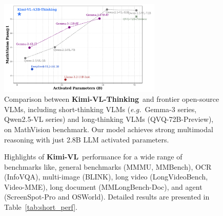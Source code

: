 \documentclass{article}
\newcommand{\ourname}{{Kimi-VL}}
\newcommand{\ourreasoningname}{{\ourname-Thinking}}
\newcommand{\ychen}[2]{\textcolor{#1}{ychen:#2}}
\begin{document}
\begin{figure}[htb!]
    \centering
    \includegraphics[width=0.69\textwidth]{figures/fig1_0409_v1.pdf}
    
    \caption{Comparison between \textbf{\ourreasoningname}~and frontier open-source VLMs, including short-thinking VLMs (\textit{e.g.}~Gemma-3 series, Qwen2.5-VL series) and long-thinking VLMs (QVQ-72B-Preview), on MathVision benchmark. Our model achieves strong multimodal reasoning with just 2.8B LLM activated parameters.} %
    \label{fig:results_via_parameter}
\end{figure}




\begin{figure}[htb]
    \centering
    \caption{Highlights of \textbf{\ourname}~performance for a wide range of benchmarks like, general benchmarks (MMMU, MMBench), OCR (InfoVQA), multi-image (BLINK), long video (LongVideoBench, Video-MME), long document (MMLongBench-Doc), and agent (ScreenSpot-Pro and OSWorld). Detailed results are presented in Table~\ref{tab:short_perf}.}
    \label{fig:General-results}
\end{figure}
\end{document}
